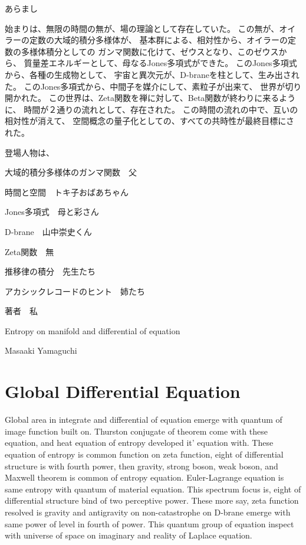 \documentclass{jsarticle}
\begin{document}
\title{}
\author{}
\date{}
\maketitle

  あらまし

  始まりは、無限の時間の無が、場の理論として存在していた。
  この無が、オイラーの定数の大域的積分多様体が、
  基本群による、相対性から、オイラーの定数の多様体積分としての
  ガンマ関数に化けて、ゼウスとなり、このゼウスから、
  質量差エネルギーとして、母なるJones多項式ができた。
  このJones多項式から、各種の生成物として、
  宇宙と異次元が、D-braneを柱として、生み出された。
  このJones多項式から、中間子を媒介にして、素粒子が出来て、
  世界が切り開かれた。
  この世界は、Zeta関数を禅に対して、Beta関数が終わりに来るように、
  時間が２通りの流れとして、存在された。
  この時間の流れの中で、互いの相対性が消えて、
  空間概念の量子化としての、すべての共時性が最終目標にされた。

  登場人物は、

  大域的積分多様体のガンマ関数　父


  時間と空間　トキ子おばあちゃん


  Jones多項式　母と彩さん


  D-brane　山中崇史くん

  
  Zeta関数　無


  推移律の積分　先生たち


  アカシックレコードのヒント　姉たち


  著者　私



\newpage
\begin{center}
  \Large   Entropy on manifold and differential of equation
\end{center}
\begin{center}
	Masaaki Yamaguchi
\end{center}

\section{Global Differential Equation}

  Global area in integrate and differential of equation emerge with quantum of image function built on.
Thurston conjugate of theorem come with these equation, and heat equation of entropy developed it' equation with.
These equation of entropy is common function on zeta function, eight of differential structure is with fourth
power, then gravity, strong boson, weak boson, and Maxwell theorem is common of entropy equation.
Euler-Lagrange equation is same entropy with quantum of material equation. This spectrum focus is,
eight of differential structure bind of two perceptive power. These more say, zeta function resolved is gravity
and antigravity on non-catastrophe on D-brane emerge with same power of level in fourth of power. This quantum
group of equation inspect with universe of space on imaginary and reality of Laplace equation.
\end{document}
